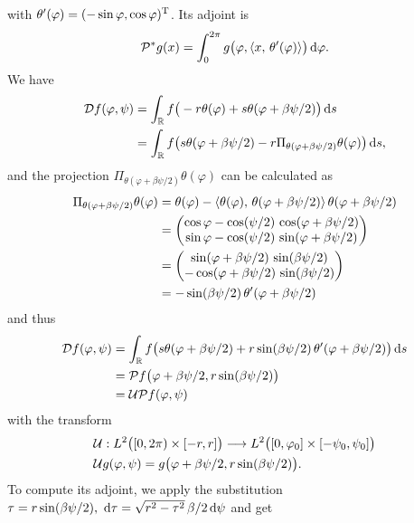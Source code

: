 \documentclass{amsart}
\renewcommand*{\phi}{\varphi}
\begin{document}
%
with $\theta'(\phi) = \TRANSP{(-\sin\phi, \cos\phi)}$. Its adjoint is
%
\begin{equation}
 \label{eq:fancurved:xray_backproj}
 \DUALOPP g(x) = \int_0^{2\pi} g\big(\phi, \INNER{x}{\theta'(\phi)}\big)\, \D\phi.
\end{equation} 
%
We have
%
\begin{align*}
 \OPD f(\phi, \psi) 
 &= \int_\RR f\big(- r\theta(\phi) + s \theta(\phi + \beta\psi/2)\big)\, \D s \\
 &= \int_\RR f\big(s \theta(\phi + \beta\psi/2) - r \Pi_{\theta(\phi + \beta\psi/2)}\theta(\phi) \big)\, \D s,
\end{align*}
%
and the projection $\Pi_{\theta(\phi + \beta\psi/2)}\theta(\phi)$ can be calculated as
%
\begin{align*}
 \Pi_{\theta(\phi + \beta\psi/2)}\theta(\phi)
 &= \theta(\phi) - \INNER{\theta(\phi)}{\theta(\phi + \beta\psi/2)}\, \theta(\phi + \beta\psi/2) \\
 &=
 \begin{pmatrix}
  \cos\phi - \cos(\psi/2)\, \cos(\phi + \beta\psi/2) \\
  \sin\phi - \cos(\psi/2)\, \sin(\phi + \beta\psi/2)
 \end{pmatrix} \\
 &=
 \begin{pmatrix}
  \sin(\phi + \beta\psi/2)\, \sin(\beta\psi/2) \\
  -\cos(\phi + \beta\psi/2)\, \sin(\beta\psi/2)
 \end{pmatrix} \\
 &= -\sin(\beta\psi/2)\, \theta'(\phi + \beta\psi/2)
\end{align*}
%
and thus 
%
\begin{align*}
 \OPD f(\phi, \psi)
 &= \int_\RR f\big(s \theta(\phi + \beta\psi/2) + r \sin(\beta\psi/2)\, \theta'(\phi + \beta\psi/2) \big)\, \D s \\
 &= \OPP f\big(\phi + \beta\psi/2, r\sin(\beta\psi/2)\big) \\
 &= \OPU \OPP f(\phi, \psi)
\end{align*}
%
with the transform
%
\begin{align}
 &\OPU: L^2\big([0,2\pi) \times [-r,r]\big) \Lto L^2\big([0,\phi_0] \times [-\psi_0,\psi_0]\big) \notag \\
 \label{eq:fancurved:unit_trafo}
 &\OPU g(\phi, \psi) = g\big(\phi + \beta\psi/2, r\sin(\beta\psi/2)\big).
\end{align} 
%
To compute its adjoint, we apply the substitution $\tau = r\sin(\beta\psi/2),\ \mathrm{d}\tau = \sqrt{r^2-\tau^2}\, \beta/2\, \mathrm{d} \psi$ and get
\end{document}
